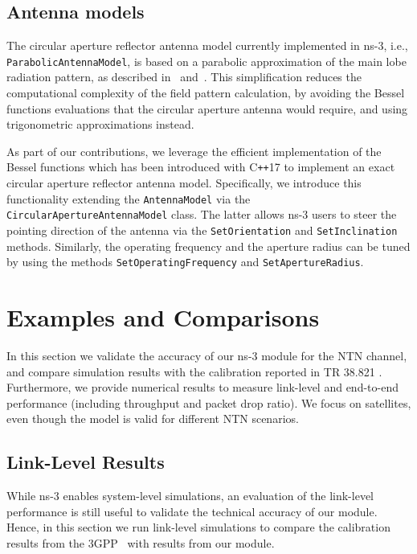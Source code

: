 \subsection{Antenna models}
The circular aperture reflector antenna model currently implemented in ns-3, i.e., \texttt{Parabolic\-Antenna\-Model}, is based on a parabolic approximation of the main lobe radiation pattern, as described in~\cite{parabolicantenna3gpp} and~\cite{parabolicantennamodel}. This simplification reduces the computational complexity of the field pattern calculation, by avoiding the Bessel functions evaluations that the circular aperture antenna would require, and using trigonometric approximations instead. 

As part of our contributions, we leverage the efficient implementation of the Bessel functions which has been introduced with C\texttt{++}17 to implement an exact circular aperture reflector antenna model. Specifically, we introduce this functionality extending the \texttt{Antenna\-Model} via the \texttt{Circular\-Aperture\-Antenna\-Model} class.
The latter allows ns-3 users to steer the pointing direction of the antenna via the \texttt{Set\-Orientation} and \texttt{Set\-Inclination} methods.
Similarly, the operating frequency and the aperture radius %
can be tuned by using the methods \texttt{Set\-Operating\-Frequency} and \texttt{Set\-Aperture\-Radius}.

\section{Examples and Comparisons}
\label{sec:results-ntn}
In this section we validate the accuracy of our ns-3 module for the NTN channel, and compare simulation results with the calibration reported in TR 38.821 \cite{38821}. Furthermore, we provide numerical results to measure link-level and end-to-end performance (including throughput and packet drop ratio). We focus on satellites, even though the model is valid for different NTN scenarios.

\subsection{Link-Level Results}
\label{sub:ll}
While ns-3 enables system-level simulations, an evaluation of the link-level performance is still useful to validate the technical accuracy of our module. Hence, in this section we run link-level simulations to compare the calibration results from the 3GPP~\cite{38821} with results from our module. 


